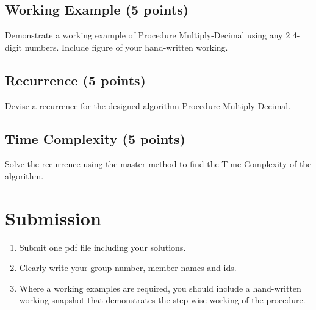 \documentclass[a4paper]{article}
\begin{document}
\subsection{Working Example (5 points)}
Demonstrate a working example of Procedure Multiply-Decimal using any 2 4-digit numbers. Include figure of your hand-written working.

\subsection{Recurrence (5 points)}
Devise a recurrence for the designed algorithm Procedure Multiply-Decimal.

\subsection{Time Complexity (5 points)}
Solve the recurrence using the master method to find the Time Complexity of the algorithm.

\section*{Submission}
\begin{enumerate}
\item Submit one pdf file including your solutions. 
\item Clearly write your group number, member names and ids. \item Where a working examples are required, you should include a hand-written working snapshot that demonstrates the step-wise working of the procedure.
\end{enumerate}
\end{document}
